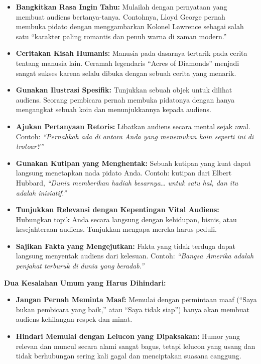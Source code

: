\documentclass[
  letterpaper,
  DIV=11,
  numbers=noendperiod]{scrreprt}
\begin{document}
\begin{itemize}
\item
  \textbf{Bangkitkan Rasa Ingin Tahu:} Mulailah dengan pernyataan yang
  membuat audiens bertanya-tanya. Contohnya, Lloyd George pernah membuka
  pidato dengan menggambarkan Kolonel Lawrence sebagai salah satu
  ``karakter paling romantis dan penuh warna di zaman modern.''
\item
  \textbf{Ceritakan Kisah Humanis:} Manusia pada dasarnya tertarik pada
  cerita tentang manusia lain. Ceramah legendaris ``Acres of Diamonds''
  menjadi sangat sukses karena selalu dibuka dengan sebuah cerita yang
  menarik.
\item
  \textbf{Gunakan Ilustrasi Spesifik:} Tunjukkan sebuah objek untuk
  dilihat audiens. Seorang pembicara pernah membuka pidatonya dengan
  hanya mengangkat sebuah koin dan menunjukkannya kepada audiens.
\item
  \textbf{Ajukan Pertanyaan Retoris:} Libatkan audiens secara mental
  sejak awal. Contoh: \emph{``Pernahkah ada di antara Anda yang
  menemukan koin seperti ini di trotoar?''}
\item
  \textbf{Gunakan Kutipan yang Menghentak:} Sebuah kutipan yang kuat
  dapat langsung menetapkan nada pidato Anda. Contoh: kutipan dari
  Elbert Hubbard, \emph{``Dunia memberikan hadiah besarnya\ldots{} untuk
  satu hal, dan itu adalah inisiatif.''}
\item
  \textbf{Tunjukkan Relevansi dengan Kepentingan Vital Audiens:}
  Hubungkan topik Anda secara langsung dengan kehidupan, bisnis, atau
  kesejahteraan audiens. Tunjukkan mengapa mereka harus peduli.
\item
  \textbf{Sajikan Fakta yang Mengejutkan:} Fakta yang tidak terduga
  dapat langsung menyentak audiens dari kelesuan. Contoh: \emph{``Bangsa
  Amerika adalah penjahat terburuk di dunia yang beradab.''}
\end{itemize}

\textbf{Dua Kesalahan Umum yang Harus Dihindari:}

\begin{itemize}
\item
  \textbf{Jangan Pernah Meminta Maaf:} Memulai dengan permintaan maaf
  (``Saya bukan pembicara yang baik,'' atau ``Saya tidak siap'') hanya
  akan membuat audiens kehilangan respek dan minat.
\item
  \textbf{Hindari Memulai dengan Lelucon yang Dipaksakan:} Humor yang
  relevan dan muncul secara alami sangat bagus, tetapi lelucon yang
  usang dan tidak berhubungan sering kali gagal dan menciptakan suasana
  canggung.
\end{itemize}
\end{document}
